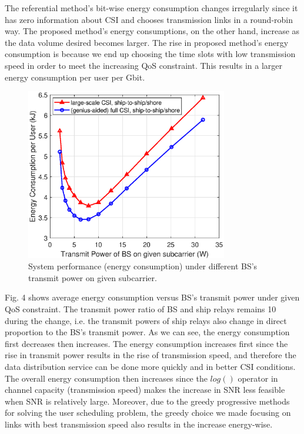 \documentclass[journal]{IEEEtran}
\begin{document}
   The referential method's bit-wise energy consumption changes irregularly since it has zero information about CSI and chooses transmission links in a round-robin way. The proposed method's energy consumptions, on the other hand, increase as the data volume desired becomes larger. The rise in proposed method's energy consumption is because we end up choosing the time slots with low transmission speed in order to meet the increasing QoS constraint. This results in a larger energy consumption per user per Gbit. 
   
   
   
   \begin{figure} [htb]
   \begin{center}
   \includegraphics*[width=8.8cm]{snrs.eps}
   \end{center}
   \vspace*{-4mm} 
   \caption{System performance (energy consumption) under different BS's transmit power on given subcarrier.}\label{fig:5}
   \vspace*{-2mm} 
   \end{figure}
  
   Fig. 4 shows average energy consumption versus BS's transmit power under given QoS constraint. The transmit power ratio of BS and ship relays remains 10 during the change, i.e. the transmit powers of ship relays also change in direct proportion to the BS's transmit power. 
   As we can see, the energy consumption first decreases then increases. 
   The energy consumption increases first since the rise in transmit power results in the rise of transmission speed, and therefore the data distribution service can be done more quickly and in better CSI conditions. 
   The overall energy consumption then increases since the $log\left({}\right)$ operator in channel capacity (transmission speed) makes the increase in SNR less feasible when SNR is relatively large. Moreover, due to the greedy progressive methods for solving the user scheduling problem, the greedy choice we made focusing on links with best transmission speed also results in the increase energy-wise. 
   
\end{document}
